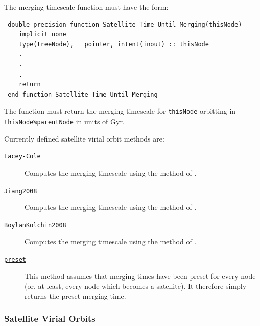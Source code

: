 The merging timescale function must have the form:
\begin{verbatim}
 double precision function Satellite_Time_Until_Merging(thisNode)
    implicit none
    type(treeNode),   pointer, intent(inout) :: thisNode
    .
    .
    .
    return
 end function Satellite_Time_Until_Merging
\end{verbatim}
The function must return the merging timescale for {\tt thisNode} orbitting in {\tt thisNode\%parentNode} in units of Gyr.

Currently defined satellite virial orbit methods are:
\begin{description}
 \item [\hyperlink{satellites.merging.dynamical_friction.timescale.Lacey-Cole.F90:dynamical_friction_lacey_cole:satellite_time_until_merging_lacey_cole}{{\tt Lacey-Cole}}] Computes the merging timescale using the method of \cite{lacey_merger_1993}.
 \item [\hyperlink{satellites.merging.dynamical_friction.timescale.Jiang2008.F90:dynamical_friction_jiang2008:satellite_time_until_merging_jiang2008}{{\tt Jiang2008}}] Computes the merging timescale using the method of \cite{jiang_fitting_2008}.
 \item [\hyperlink{satellites.merging.dynamical_friction.timescale.Boylan-Kolchin2008.F90:dynamical_friction_boylankolchin2008:satellite_time_until_merging_boylankolchin2008}{{\tt BoylanKolchin2008}}] Computes the merging timescale using the method of \cite{boylan-kolchin_dynamical_2008}.
 \item [\hyperlink{satellites.merging.preset.F90:satellite_merging_times_preset:satellite_time_until_merging_preset}{{\tt preset}}] This method assumes that merging times have been preset for every node (or, at least, every node which becomes a satellite). It therefore simply returns the preset merging time.
\end{description}

\subsubsection{Satellite Virial Orbits}

